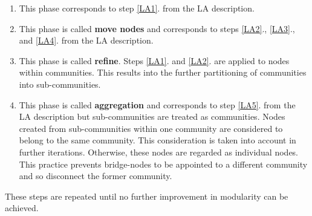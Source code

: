 \begin{enumerate}[label=\alph*)]
  \label{leidenAlgorithmPrinciple}
  \item This phase corresponds to step \ref{LA1}. from the LA description. 
    \label{LeAa}
  \item This phase is called \textbf{move nodes} and corresponds to steps \ref{LA2}., \ref{LA3}., and \ref{LA4}. from the LA description. 
    \label{LeAb}
  \item This phase is called \textbf{refine}. Steps \ref{LA1}. and \ref{LA2}. are applied to nodes within communities. This results into the further partitioning of communities into sub-communities.
    \label{LeAc}
  \item This phase is called \textbf{aggregation} and corresponds to step \ref{LA5}. from the LA description but sub-communities are treated as communities. Nodes created from sub-communities within one community are considered to belong to the same community. This consideration is taken into account in further iterations. Otherwise, these nodes are regarded as individual nodes. This practice prevents bridge-nodes to be appointed to a different community and so disconnect the former community.
    \label{LeAd}
\end{enumerate}
These steps are repeated until no further improvement in modularity can be achieved.